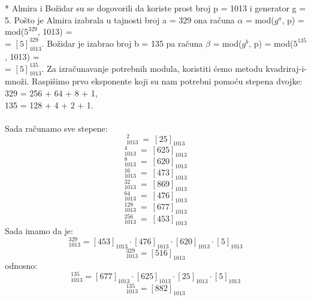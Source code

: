\documentclass[12pt]{article}
\begin{document}
\begin{enumerate}
* Almira i Božidar su se dogovorili da koriste prost broj p = 1013 i generator
g = 5. Pošto je Almira izabrala u tajnosti broj a = 329 ona računa ${\alpha}$ = mod($g^a$, p) = mod($5^{329}$, 1013) = \\
= $[5]_{1013}^{329}$. Božidar je izabrao broj b = 135 pa računa ${\beta}$ = mod($g^{b}$, p) = mod($5^{135}$, 1013) = \\
= $[5]_{1013}^{135}$. Za izračunavanje
potrebnih modula, koristiti ćemo metodu kvadriraj-i-množi. Raspišimo prvo
eksponente koji su nam potrebni pomoću stepena dvojke: \\
329 = 256 + 64 + 8 + 1, \\
135 = 128 + 4 + 2 + 1. \\
\\
Sada računamo sve stepene: \\ 
\begin{equation*}
    [5]_{1013}^{2}~=~[25]_{1013}
\end{equation*}
\begin{equation*}
    [5]_{1013}^{4}~=~[625]_{1013}
\end{equation*}
\begin{equation*}
    [5]_{1013}^{8}~=~[620]_{1013}
\end{equation*}
\begin{equation*}
    [5]_{1013}^{16}~=~[473]_{1013}
\end{equation*}
\begin{equation*}
    [5]_{1013}^{32}~=~[869]_{1013}
\end{equation*}
\begin{equation*}
    [5]_{1013}^{64}~=~[476]_{1013}
\end{equation*}
\begin{equation*}
    [5]_{1013}^{128}~=~[677]_{1013}
\end{equation*}
\begin{equation*}
    [5]_{1013}^{256}~=~[453]_{1013}
\end{equation*}
Sada imamo da je:
\begin{equation*}
    [5]_{1013}^{329} = [453]_{1013} \cdot [476]_{1013} \cdot [620]_{1013} \cdot [5]_{1013}
\end{equation*}
\begin{equation*}
    [5]_{1013}^{329} = [516]_{1013}
\end{equation*}
odnosno: 
\begin{equation*}
    [5]_{1013}^{135} = [677]_{1013} \cdot [625]_{1013} \cdot [25]_{1013} \cdot [5]_{1013}
\end{equation*}
\begin{equation*}
    [5]_{1013}^{135} = [882]_{1013}
\end{equation*}


\end{enumerate}
\end{document}
